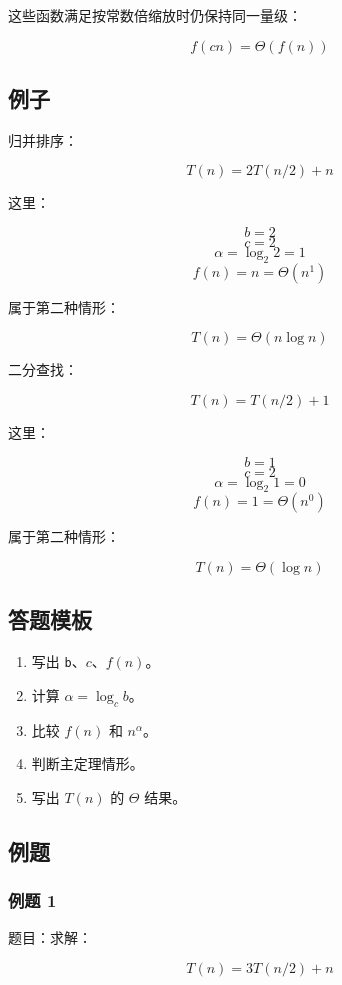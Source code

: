 \documentclass[UTF8,zihao=-4]{ctexart}
\begin{document}
这些函数满足按常数倍缩放时仍保持同一量级：

\[f(cn) = \Theta(f(n))\]

\subsection*{例子}

归并排序：

\[T(n) = 2T(n/2) + n\]

这里：

\[b = 2\]
\[c = 2\]
\[\alpha = \log_2 2 = 1\]
\[f(n) = n = \Theta(n^{1})\]

属于第二种情形：

\[T(n) = \Theta(n \log n)\]

二分查找：

\[T(n) = T(n/2) + 1\]

这里：

\[b = 1\]
\[c = 2\]
\[\alpha = \log_2 1 = 0\]
\[f(n) = 1 = \Theta(n^{0})\]

属于第二种情形：

\[T(n) = \Theta(\log n)\]

\subsection*{答题模板}

\begin{enumerate}
\item 写出 \texttt{b}、$c$、$f(n)$。
\item 计算 $\alpha = \log_c b$。
\item 比较 $f(n)$ 和 $n^\alpha$。
\item 判断主定理情形。
\item 写出 $T(n)$ 的 $\Theta$ 结果。
\end{enumerate}

\subsection*{例题}

\subsubsection*{例题 1}

题目：求解：

\[T(n) = 3T(n/2) + n\]
\end{document}
